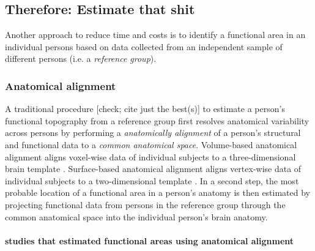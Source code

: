 \subsection{Therefore: Estimate that shit}

Another approach to reduce time and costs is to identify a functional area in an
individual persons based on data collected from an independent sample of
different persons (i.e. a \textit{reference group}).



\subsubsection{Anatomical alignment}

%
A traditional procedure \citep{frost2012measuring, weiner2018defining,
zhen2017quantifying, zhen2015quantifying, rosenke2021probabilistic,
wang2015probabilistic} [check; cite just the best(s)] to estimate a person's
functional topography from a reference group first resolves anatomical
variability across persons by performing a \textit{anatomically alignment} of a
person's structural and functional data to a \textit{common anatomical space}.
Volume-based anatomical alignment \citep[s.][for a review]{klein2009evaluation}
aligns voxel-wise data of individual subjects to a three-dimensional brain
template \citep[e.g., MNI152 template;][]{fonov2011unbiased}.
Surface-based anatomical alignment \citep{fischl1999cortical} aligns vertex-wise
data of individual subjects to a two-dimensional template \citep[e.g.,
FreeSurfer fsaverage template;][]{fischl1999high}.
In a second step, the most probable location of a functional area in a person's
anatomy is then estimated by projecting functional data from persons in the
reference group through the common anatomical space into the individual person's
brain anatomy.


\paragraph{studies that estimated functional areas using anatomical alignment}



